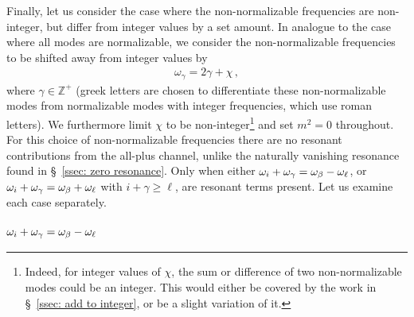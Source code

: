 \documentclass[../PhD.tex]{subfiles}
\newcommand{\obet}{\omega_{\beta}}
\newcommand{\ogam}{\omega_\gamma}
\begin{document}
Finally, let us consider the case where the non-normalizable frequencies are non-integer, but differ from integer values by a set amount. In analogue to the case where all modes are normalizable, we consider the non-normalizable frequencies to be shifted away from integer values by
\begin{align}
\label{int plus chi}
\ogam = 2\gamma + \chi \, ,
\end{align}
where $\gamma \in \mathbb{Z}^+$ (greek letters are chosen to differentiate these non-normalizable modes from normalizable modes with integer frequencies, which use roman letters). We furthermore limit $\chi$ to be non-integer\footnote{Indeed, for integer values of $\chi$, the sum or difference of two non-normalizable modes could be an integer. This would either be covered by the work in \S\!~\ref{ssec: add to integer}, or be a slight variation of it.} and set $m^2 = 0$ throughout. For this choice of non-normalizable frequencies there are no resonant contributions from the all-plus channel, unlike the naturally vanishing resonance found in \S\!~\ref{ssec: zero resonance}. Only when either $\oi + \ogam = \obet - \ol$, or $\oi + \ogam = \obet + \ol$ with $i + \gamma \geq \ell$, are resonant terms present. Let us examine each case separately.

\subsubsection{$\oi + \ogam = \obet - \ol$}
\label{sssec: intpluschi1}
\end{document}

